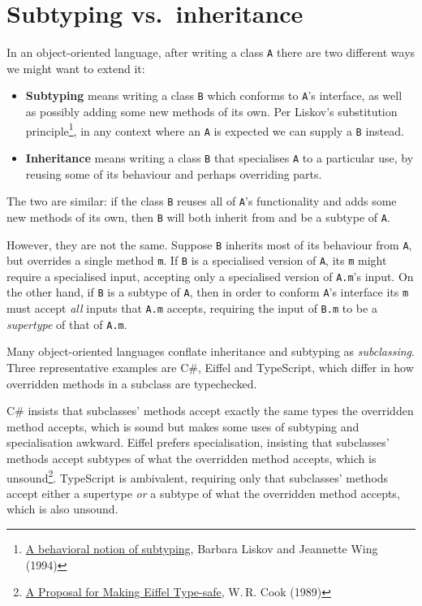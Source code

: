 \documentclass[11pt,oneside]{article}
\makeatletter
\newenvironment{ceitemize}{\begin{itemize}}{\end{itemize}}
\newcommand{\code}[1]{\texttt{#1}}
\newcommand{\tags}[1]{%
  \par\vspace{-0.55\baselineskip}%
  \noindent{\footnotesize\sffamily\color{lichen}#1}%
  \par\vspace{0.75\baselineskip}%
  \@afterindentfalse\@afterheading}
\makeatother
\begin{document}
\clearpage
\section{Subtyping vs.~inheritance}\label{ce:subtyping-vs-inheritance}
\tags{\hyperref[gloss:subtyping]{Subtyping}}
In an object-oriented language, after writing a class \code{A} there are two different ways we might want to extend it:

\begin{ceitemize}
\item \textbf{Subtyping} means writing a class \code{B} which conforms to \code{A}'s interface, as well as possibly adding some new methods of its own. Per Liskov's substitution principle\footnote{\href{https://dl.acm.org/doi/10.1145/197320.197383}{A behavioral notion of subtyping}, Barbara Liskov and Jeannette Wing (1994)}, in any context where an \code{A} is expected we can supply a \code{B} instead.
\item \textbf{Inheritance} means writing a class \code{B} that specialises \code{A} to a particular use, by reusing some of its behaviour and perhaps overriding parts.
\end{ceitemize}

The two are similar: if the class \code{B} reuses all of \code{A}'s functionality and adds some new methods of its own, then \code{B} will both inherit from and be a subtype of \code{A}.

However, they are not the same. Suppose \code{B} inherits most of its behaviour from \code{A}, but overrides a single method \code{m}. If \code{B} is a specialised version of \code{A}, its \code{m} might require a specialised input, accepting only a specialised version of \code{A.m}'s input. On the other hand, if \code{B} is a subtype of \code{A}, then in order to conform \code{A}'s interface its \code{m} must accept \emph{all} inputs that \code{A.m} accepts, requiring the input of \code{B.m} to be a \emph{supertype} of that of \code{A.m}.

Many object-oriented languages conflate inheritance and subtyping as \emph{subclassing}. Three representative examples are C\#, Eiffel and TypeScript, which differ in how overridden methods in a subclass are typechecked.

C\# insists that subclasses' methods accept exactly the same types the overridden method accepts, which is sound but makes some uses of subtyping and specialisation awkward. Eiffel prefers specialisation, insisting that subclasses' methods accept subtypes of what the overridden method accepts, which is unsound\footnote{\href{https://academic.oup.com/comjnl/article/32/4/305/377555}{A Proposal for Making Eiffel Type-safe}, W.\,R. Cook (1989)}. TypeScript is ambivalent, requiring only that subclasses' methods accept either a supertype \emph{or} a subtype of what the overridden method accepts, which is also unsound.
\end{document}
